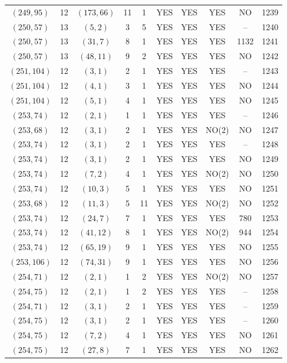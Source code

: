 \begin{longtable}{|c|c|c|c|c|c|c|c|c|c|}
$(249, 95)$ & 12 & $(173, 66)$ & 11 & 1 & YES & YES & YES & NO & 1239\\
$(250, 57)$ & 13 & $(5, 2)$ & 3 & 5 & YES & YES & YES & -- & 1240\\
$(250, 57)$ & 13 & $(31, 7)$ & 8 & 1 & YES & YES & YES & 1132 & 1241\\
$(250, 57)$ & 13 & $(48, 11)$ & 9 & 2 & YES & YES & YES & NO & 1242\\
$(251, 104)$ & 12 & $(3, 1)$ & 2 & 1 & YES & YES & YES & -- & 1243\\
$(251, 104)$ & 12 & $(4, 1)$ & 3 & 1 & YES & YES & YES & NO & 1244\\
$(251, 104)$ & 12 & $(5, 1)$ & 4 & 1 & YES & YES & YES & NO & 1245\\
$(253, 74)$ & 12 & $(2, 1)$ & 1 & 1 & YES & YES & YES & -- & 1246\\
$(253, 68)$ & 12 & $(3, 1)$ & 2 & 1 & YES & YES & NO(2) & NO & 1247\\
$(253, 74)$ & 12 & $(3, 1)$ & 2 & 1 & YES & YES & YES & -- & 1248\\
$(253, 74)$ & 12 & $(3, 1)$ & 2 & 1 & YES & YES & YES & NO & 1249\\
$(253, 74)$ & 12 & $(7, 2)$ & 4 & 1 & YES & YES & NO(2) & NO & 1250\\
$(253, 74)$ & 12 & $(10, 3)$ & 5 & 1 & YES & YES & YES & NO & 1251\\
$(253, 68)$ & 12 & $(11, 3)$ & 5 & 11 & YES & YES & NO(2) & NO & 1252\\
$(253, 74)$ & 12 & $(24, 7)$ & 7 & 1 & YES & YES & YES & 780 & 1253\\
$(253, 74)$ & 12 & $(41, 12)$ & 8 & 1 & YES & YES & NO(2) & 944 & 1254\\
$(253, 74)$ & 12 & $(65, 19)$ & 9 & 1 & YES & YES & YES & NO & 1255\\
$(253, 106)$ & 12 & $(74, 31)$ & 9 & 1 & YES & YES & YES & NO & 1256\\
$(254, 71)$ & 12 & $(2, 1)$ & 1 & 2 & YES & YES & NO(2) & NO & 1257\\
$(254, 75)$ & 12 & $(2, 1)$ & 1 & 2 & YES & YES & YES & -- & 1258\\
$(254, 71)$ & 12 & $(3, 1)$ & 2 & 1 & YES & YES & YES & -- & 1259\\
$(254, 75)$ & 12 & $(3, 1)$ & 2 & 1 & YES & YES & YES & -- & 1260\\
$(254, 75)$ & 12 & $(7, 2)$ & 4 & 1 & YES & YES & YES & NO & 1261\\
$(254, 75)$ & 12 & $(27, 8)$ & 7 & 1 & YES & YES & YES & NO & 1262\\

\end{longtable}
